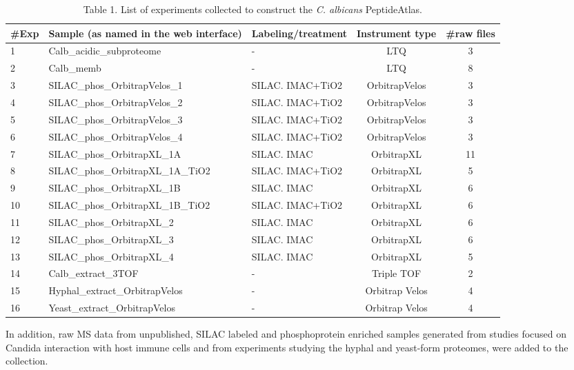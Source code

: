 \begin{table}[t]
\caption*{Table 1. List of experiments collected to construct the \textit{C. albicans} PeptideAtlas.}
\renewcommand{\arraystretch}{1.5}
\footnotesize
\centering
\begin{tabular}{l p{4cm} p{2cm} c c }
\hline
\#Exp & Sample \newline{} (as named in the web interface) & Labeling/treatment & Instrument type & \#raw files\\
\hline
1 & Calb\_acidic\_subproteome & - & LTQ & 3\\
2 & Calb\_memb & - & LTQ & 8\\
3 & SILAC\_phos\_OrbitrapVelos\_1 & SILAC. IMAC+TiO2 & OrbitrapVelos & 3\\
4 & SILAC\_phos\_OrbitrapVelos\_2 & SILAC. IMAC+TiO2 & OrbitrapVelos & 3\\
5 & SILAC\_phos\_OrbitrapVelos\_3 & SILAC. IMAC+TiO2 & OrbitrapVelos & 3\\
6 & SILAC\_phos\_OrbitrapVelos\_4 & SILAC. IMAC+TiO2 & OrbitrapVelos & 3\\
7 & SILAC\_phos\_OrbitrapXL\_1A & SILAC. IMAC & OrbitrapXL & 11\\
8 & SILAC\_phos\_OrbitrapXL\_1A\_TiO2 & SILAC. IMAC+TiO2 & OrbitrapXL & 5\\
9 & SILAC\_phos\_OrbitrapXL\_1B & SILAC. IMAC & OrbitrapXL & 6\\
10 & SILAC\_phos\_OrbitrapXL\_1B\_TiO2 & SILAC. IMAC+TiO2 & OrbitrapXL & 6\\
11 & SILAC\_phos\_OrbitrapXL\_2 & SILAC. IMAC & OrbitrapXL & 6\\
12 & SILAC\_phos\_OrbitrapXL\_3 & SILAC. IMAC & OrbitrapXL & 6\\
13 & SILAC\_phos\_OrbitrapXL\_4 & SILAC. IMAC & OrbitrapXL & 5\\
14 & Calb\_extract\_3TOF & - & Triple TOF & 2\\
15 & Hyphal\_extract\_OrbitrapVelos & - & Orbitrap Velos & 4\\
16 & Yeast\_extract\_OrbitrapVelos & - & Orbitrap Velos & 4\\
\end{tabular}
\end{table}


 

In addition, raw MS data from unpublished, SILAC labeled
and phosphoprotein enriched samples generated from studies
focused on Candida interaction with host immune cells and from
experiments studying the hyphal and yeast-form proteomes,
were added to the collection.



